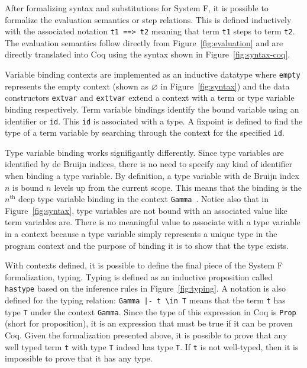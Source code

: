 \documentclass{sig-alternate}
\begin{document}
After formalizing syntax and substitutions for System F, it is possible to formalize the evaluation semantics or step relations. This is defined inductively with the associated notation \texttt{t1 ==> t2} meaning that term \texttt{t1} steps to term \texttt{t2}. The evaluation semantics follow directly from Figure~\ref{fig:evaluation} and are directly translated into Coq using the syntax shown in Figure~\ref{fig:syntax-coq}.

Variable binding contexts are implemented as an inductive datatype where \texttt{empty} represents the empty context (shown as $\varnothing$ in Figure~\ref{fig:syntax}) and the data constructors \texttt{ext\textunderscore var} and \texttt{ext\textunderscore tvar} extend a context with a term or type variable binding respectively. Term variable bindings identify the bound variable using an identifier or \texttt{id}. This \texttt{id} is associated with a type. A fixpoint is defined to find the type of a term variable by searching through the context for the specified \texttt{id}.

Type variable binding works signifigantly differently. Since type variables are identified by de Bruijn indices, there is no need to specify any kind of identifier when binding a type variable. By definition, a type variable with de Bruijn index $n$ is bound $n$ levels up from the current scope. This means that the binding is the $n^\text{th}$ deep type variable binding in the context \texttt{Gamma}~\cite{Vouillon12}. Notice also that in Figure~\ref{fig:syntax}, type variables are not bound with an associated value like term variables are. There is no meaningful value to associate with a type variable in a context because a type variable simply represents a unique type in the program context and the purpose of binding it is to show that the type exists.

With contexts defined, it is possible to define the final piece of the System F formalization, typing. Typing is defined as an inductive proposition called \texttt{has\textunderscore type} based on the inference rules in Figure~\ref{fig:typing}. A notation is also defined for the typing relation: \texttt{Gamma |- t \textbackslash in T} means that the term \texttt{t} has type \texttt{T} under the context \texttt{Gamma}. Since the type of this expression in Coq is \texttt{Prop} (short for proposition), it is an expression that must be true if it can be proven Coq. Given the formalization presented above, it is possible to prove that any well typed term \texttt{t} with type \texttt{T} indeed has type \texttt{T}. If \texttt{t} is not well-typed, then it is impossible to prove that it has any type.
\end{document}
